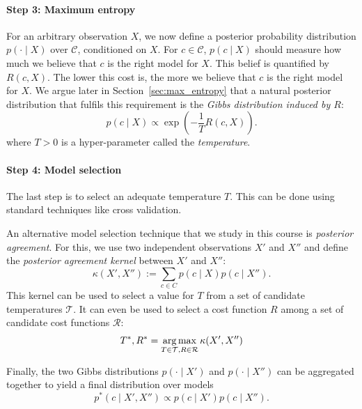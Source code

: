 \paragraph{Step 3: Maximum entropy} For an arbitrary observation $X$, we now define a posterior probability distribution $p(\cdot \mid X)$ over $\mathcal{C}$, conditioned on $X$. For $c \in \mathcal{C}$, $p(c \mid X)$ should measure how much we believe that $c$ is the right model for $X$. This belief is quantified by $R(c, X)$. The lower this cost is, the more we believe that $c$ is the right model for $X$. We argue later in Section~\ref{sec:max_entropy} that a natural posterior distribution that fulfils this requirement is the \emph{Gibbs distribution induced by $R$}:
%
\begin{equation}
p(c \mid X) \propto \exp\left(- \frac{1}{T} R(c, X)\right).
\label{eq:max_ent_dist}
\end{equation}
%
where $T > 0$ is a hyper-parameter called the \emph{temperature}.

\paragraph{Step 4: Model selection} The last step is to select an adequate temperature $T$. This can be done using standard techniques like cross validation. 

An alternative model selection technique that we study in this course is \emph{posterior agreement}. For this, we use two independent observations $X'$ and $X''$ and define the \emph{posterior agreement kernel} between $X'$ and $X''$:
%
\begin{equation}
\kappa(X', X'') := \sum_{c \in C} p(c \mid X) p(c \mid X'').
\label{eq:kernel_post_agr}
\end{equation}
%
This kernel can be used to select a value for $T$ from a set of candidate temperatures $\mathcal{T}$. It can even be used to select a cost function $R$ among a set of candidate cost functions $\mathcal{R}$:
%
\begin{equation}
T^*, R^* = \operatorname*{arg\,max}_{T \in \mathcal{T}, R \in \mathcal{R}} \kappa(X', X'')
\end{equation}

Finally, the two Gibbs distributions $p(\cdot \mid X')$ and $p(\cdot \mid X'')$ can be aggregated together to yield a final distribution over models
%
\begin{equation}
p^*(c \mid X', X'') \propto p(c \mid X')p(c \mid X'').
\label{eq:final_post_dist}
\end{equation}

